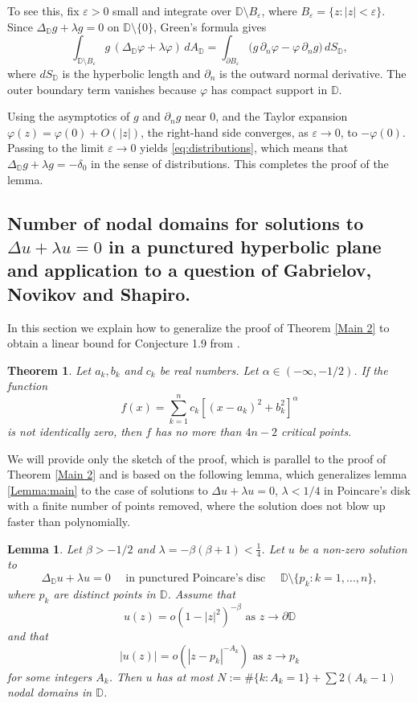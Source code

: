 \documentclass{article}
\newtheorem{theorem}{Theorem}[section]
\newtheorem{lemma}{Lemma}[section]
\begin{document}
To see this, fix
$\varepsilon>0$ small and integrate over $\mathbb{D}\setminus B_\varepsilon$,
where $B_\varepsilon=\{z:|z|<\varepsilon\}$. Since
$\Delta_{\mathbb{D}} g + \lambda g = 0$ on $\mathbb{D}\setminus\{0\}$, Green’s
formula gives
\[
\int_{\mathbb{D}\setminus B_\varepsilon} g\,(\Delta_{\mathbb{D}}\varphi+\lambda\varphi)\,dA_{\mathbb{D}}
= \int_{\partial B_\varepsilon}\bigl(g\,\partial_n\varphi-\varphi\,\partial_n g\bigr)\,dS_{\mathbb{D}},
\]
where $dS_{\mathbb{D}}$ is the
hyperbolic length and $\partial_n$ is the outward normal derivative. The outer boundary term vanishes because $\varphi$ has
compact support in $\mathbb{D}$.

Using the asymptotics of $g$ and $\partial_n g$ near $0$, and the Taylor
expansion $\varphi(z)=\varphi(0)+O(|z|)$, the right-hand side converges, as
$\varepsilon\to0$, to $-\varphi(0)$. Passing to the limit
$\varepsilon\to0$ yields \eqref{eq:distributions}, which means that $\Delta_{\mathbb{D}}g+\lambda g=-\delta_0$ in the sense of
distributions. This completes the proof of the lemma. 




\subsection*{Number of nodal domains for solutions to $\Delta u+\lambda u=0$ in a punctured hyperbolic plane  and application to a question of Gabrielov, Novikov and Shapiro.}

In this section we explain how to generalize the proof of Theorem \ref{Main 2} to obtain a linear bound for Conjecture 1.9 from \cite{GNS}.

\begin{theorem} \label{Main 4}
Let $a_k, b_k$ and $c_k$ be real numbers.  Let $\alpha \in (-\infty, -1/2)$. If the function
\[
f(x)=\sum_{k=1}^{n}c_{k}[(x-a_{k})^{2}+b_{k}^{2}]^{\alpha}
\]
is not identically zero, then $f$ has no more than $4n-2$ critical points.
\end{theorem}

We will provide only the sketch of the proof, which is parallel to the proof of Theorem \ref{Main 2} and is based on the following lemma, which generalizes lemma \ref{Lemma:main} to the case of solutions to $\Delta u + \lambda u=0$, $\lambda <1/4$ in Poincare's disk with a finite number of points removed, where the solution does not blow up faster than polynomially.

\begin{lemma} \label{Lemma:main 2}
Let $\beta>-1/2$ and $\lambda=-\beta(\beta+1)< \frac{1}{4}$. Let $u$ be a non-zero solution to
\[
\Delta_{\mathbb{D}} u + \lambda u=0 \quad \text{ in punctured Poincare's disc } \quad \mathbb{D}\setminus \{p_k:k=1, \dots, n\},
\]
where $p_k$ are distinct points in $\mathbb{D}$. Assume that $$u(z) = o(1-|z|^2)^{-\beta} \text{ as } z \to \partial \mathbb{D}$$ and that 
$$|u(z)|= o(|z-p_k|^{-A_k}) \text{ as } z\to p_k$$
for some integers $A_k$.
 Then $u$ has at most $N:=\#\{k:A_k=1\} + \sum2(A_k-1)$ nodal domains in $\mathbb{D}$.
\end{lemma}
\end{document}
